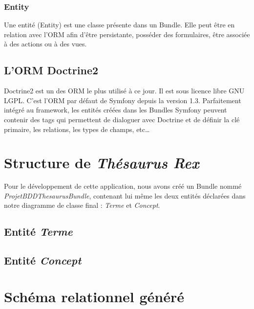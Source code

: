 \subsubsection{Entity}
Une entité (Entity) est une classe présente dans un Bundle. Elle peut être en relation avec l'ORM afin d'être persistante, posséder des formulaires, être associée à des actions ou à des vues.

\subsection{L'ORM Doctrine2}

Doctrine2 est un des ORM le plus utilisé à ce jour. Il est sous licence libre GNU LGPL. C'est l'ORM par défaut de Symfony depuis la version 1.3. Parfaitement intégré au framework, les entités créées dans les Bundles Symfony peuvent contenir des tags qui permettent de dialoguer avec Doctrine et de définir la clé primaire, les relations, les types de champs, etc\ldots

\section{Structure de \emph{Thésaurus Rex}}

Pour le développement de cette application, nous avons créé un Bundle nommé \emph{ProjetBDDThesaurusBundle}, contenant lui même les deux entités déclarées dans notre diagramme de classe final : \emph{Terme} et \emph{Concept}.

\subsection{Entité \emph{Terme}}


\subsection{Entité \emph{Concept}}


\section{Schéma relationnel généré}

